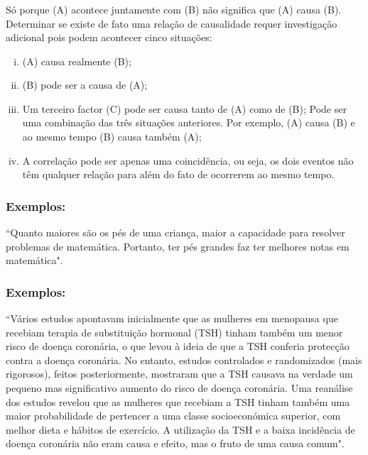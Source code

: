 \documentclass[14pt,aspectratio=1610]{beamer}
\begin{document}
\begin{frame}{}
\frametitle{ }
\begin{block}{}
\justifying
Só porque (A) acontece juntamente com (B) não significa que (A) causa (B). Determinar se existe de fato uma relação de causalidade requer  investigação adicional pois podem acontecer cinco situações:
\begin{enumerate}[(i)]
\item (A) causa realmente (B);\pause
\item (B) pode ser a causa de (A);\pause
\item Um terceiro factor (C) pode ser causa tanto de (A) como de (B);\pause
Pode ser uma combinação das três situações anteriores. Por exemplo, (A) causa (B) e ao mesmo tempo (B) causa também (A);\pause
\item A correlação pode ser apenas uma coincidência, ou seja, os dois eventos não têm qualquer relação para além do fato de ocorrerem ao mesmo tempo. 
\end{enumerate}
\end{block}
\end{frame}

\begin{frame}{}
\frametitle{Exemplos:}
\begin{block}{}
\justifying
``Quanto maiores são os pés de uma criança, maior a capacidade para resolver problemas de matemática. Portanto, ter pés grandes faz ter melhores notas em matemática". 
\end{block}
\end{frame}

\begin{frame}{}
\frametitle{Exemplos:}
\begin{block}{}
\justifying
``Vários estudos apontavam inicialmente que as mulheres em menopausa que recebiam terapia de substituição hormonal (TSH) tinham também um menor risco de doença coronária, o que levou à ideia de que a TSH conferia protecção contra a doença coronária. No entanto, estudos controlados e randomizados (mais rigorosos), feitos posteriormente, mostraram que a TSH causava na verdade um pequeno mas significativo aumento do risco de doença coronária. Uma reanálise dos estudos revelou que as mulheres que recebiam a TSH tinham também uma maior probabilidade de pertencer a uma classe socioeconómica superior, com melhor dieta e hábitos de exercício. A utilização da TSH e a baixa incidência de doença coronária não eram causa e efeito, mas o fruto de uma causa comum". 
\end{block}
\end{frame}
\end{document}
